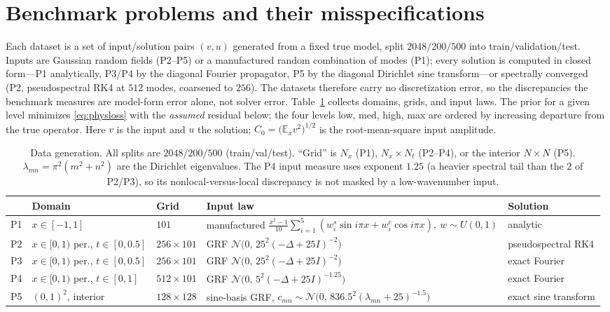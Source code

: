 \documentclass[11pt]{article}
\newcommand{\E}{\mathbb{E}}
\newcommand{\lap}{\Delta}
\begin{document}
\section{Benchmark problems and their misspecifications}
\label{sec:data}

Each dataset is a set of input/solution pairs $(v,u)$ generated from a fixed true model, split
$2048/200/500$ into train/validation/test. Inputs are Gaussian random fields (P2--P5) or a
manufactured random combination of modes (P1); every solution is computed in closed form---P1
analytically, P3/P4 by the diagonal Fourier propagator, P5 by the diagonal Dirichlet sine
transform---or spectrally converged (P2, pseudospectral RK4 at $512$ modes, coarsened to $256$).
The datasets therefore carry no discretization error, so the discrepancies the benchmark measures
are model-form error alone, not solver error. Table~\ref{tab:gen} collects domains, grids, and
input laws. The prior for a given level minimizes \eqref{eq:physloss} with the \emph{assumed}
residual below; the four levels \textsf{low}, \textsf{med}, \textsf{high}, \textsf{max} are ordered
by increasing departure from the true operator. Here $v$ is the input and $u$ the solution;
$C_0=\big(\E_x v^2\big)^{1/2}$ is the root-mean-square input amplitude.

\begin{table}[h]
\centering
\footnotesize
\setlength{\tabcolsep}{5pt}
\begin{tabular}{@{}lllll@{}}
\toprule
& Domain & Grid & Input law & Solution \\
\midrule
P1 & $x\in[-1,1]$ & $101$ & manufactured $\tfrac{x^2-1}{10}\sum_{i=1}^{5}(w^s_i\sin i\pi x+w^c_i\cos i\pi x),\ w\!\sim\!U(0,1)$ & analytic \\
P2 & $x\in[0,1)$ per., $t\in[0,0.5]$ & $256\times101$ & GRF $\mathcal{N}\!\big(0,\,25^2(-\lap+25I)^{-2}\big)$ & pseudospectral RK4 \\
P3 & $x\in[0,1)$ per., $t\in[0,0.5]$ & $256\times101$ & GRF $\mathcal{N}\!\big(0,\,25^2(-\lap+25I)^{-2}\big)$ & exact Fourier \\
P4 & $x\in[0,1)$ per., $t\in[0,1]$ & $512\times101$ & GRF $\mathcal{N}\!\big(0,\,5^2(-\lap+25I)^{-1.25}\big)$ & exact Fourier \\
P5 & $(0,1)^2$, interior & $128\times128$ & sine-basis GRF, $c_{mn}\!\sim\!\mathcal{N}\!\big(0,\,836.5^2(\lambda_{mn}+25)^{-1.5}\big)$ & exact sine transform \\
\bottomrule
\end{tabular}
\caption{Data generation. All splits are $2048/200/500$ (train/val/test). ``Grid'' is $N_x$ (P1),
$N_x\times N_t$ (P2--P4), or the interior $N\times N$ (P5). $\lambda_{mn}=\pi^2(m^2+n^2)$ are the
Dirichlet eigenvalues. The P4 input measure uses exponent $1.25$ (a heavier spectral tail than the
$2$ of P2/P3), so its nonlocal-versus-local discrepancy is not masked by a low-wavenumber input.}
\label{tab:gen}
\end{table}
\end{document}
